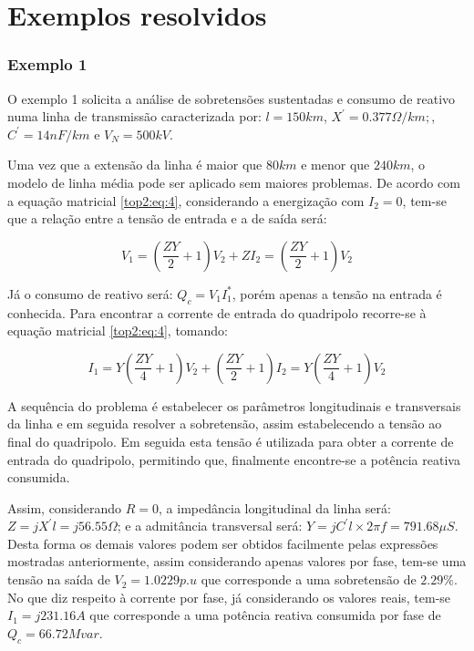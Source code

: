 \section{Exemplos resolvidos}
\subsubsection*{Exemplo 1}

O exemplo 1 solicita a análise de sobretensões sustentadas e consumo de reativo numa linha de transmissão caracterizada por: $l=150km$, $X^'=0.377\Omega/km;$, $C^'=14nF/km$ e $V_N=500kV$.

Uma vez que a extensão da linha é maior que $80 km$ e menor que $240 km$, o modelo de linha média pode ser aplicado sem maiores problemas. De acordo com a equação matricial \ref{top2:eq:4}, considerando a energização com $I_2=0$, tem-se que a relação entre a tensão de entrada e a de saída será:

\begin{equation} \label{exe:1:1}
    V_1 = \left(\frac{ZY}{2}+1\right)V_2 + ZI_2 = \left(\frac{ZY}{2}+1\right)V_2
\end{equation}

Já o consumo de reativo será: $Q_c = V_1I_1^*$, porém apenas a tensão na entrada é conhecida. Para encontrar a corrente de entrada do quadripolo recorre-se à equação matricial \ref{top2:eq:4}, tomando:

\begin{equation} \label{exe:1:2}
    I_1 = Y\left(\frac{ZY}{4}+1\right)V_2 + \left(\frac{ZY}{2}+1\right)I_2 = Y\left(\frac{ZY}{4}+1\right)V_2
\end{equation}

A sequência do problema é estabelecer os parâmetros longitudinais e transversais da linha e em seguida resolver a sobretensão, assim estabelecendo a tensão ao final do quadripolo. Em seguida esta tensão é utilizada para obter a corrente de entrada do quadripolo, permitindo que, finalmente encontre-se a potência reativa consumida.

Assim, considerando $R=0$, a impedância longitudinal da linha será: $Z = jX^{'}l = j56.55 \Omega$; e a admitância transversal será: $Y = jC^{'} l \times 2\pi f = 791.68 \mu S$. Desta forma os demais valores podem ser obtidos facilmente pelas expressões mostradas anteriormente, assim considerando apenas valores por fase, tem-se uma tensão na saída de $V_2 = 1.0229 p.u$ que corresponde a uma sobretensão de $2.29\%$. No que diz respeito à corrente por fase, já considerando os valores reais, tem-se $I_1 = j231.16 A$ que corresponde a uma potência reativa consumida por fase de $Q_c = 66.72 Mvar$.

